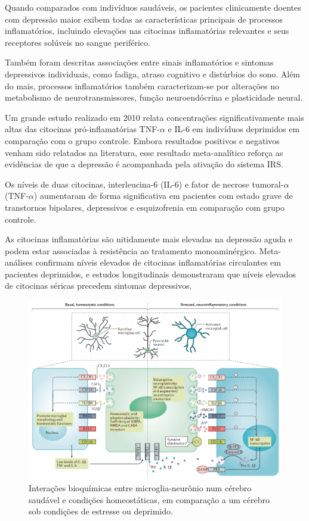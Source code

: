 Quando comparados com indivíduos saudáveis, os pacientes clinicamente doentes com depressão maior exibem todas as características principais de processos inflamatórios, incluindo elevações nas citocinas inflamatórias relevantes e seus receptores solúveis no sangue periférico. \cite{Raison2009}

Também foram descritas associações entre sinais inflamatórios e sintomas depressivos individuais, como fadiga, atraso cognitivo e distúrbios do sono. Além do mais, processos inflamatórios também caracterizam-se por alterações no metabolismo de neurotransmissores, função neuroendócrina e plasticidade neural.\cite{Raison2009} 

Um grande estudo realizado em 2010 relata concentrações significativamente mais altas das citocinas pró-inflamatórias TNF-$\alpha$ e IL-6 em indivíduos deprimidos em comparação com o grupo controle. Embora resultados positivos e negativos venham sido relatados na literatura, esse resultado meta-analítico reforça as evidências de que a depressão é acompanhada pela ativação do sistema IRS. \cite{Dawlati2010}

Os níveis de duas citocinas, interleucina-6 (IL-6) e fator de necrose tumoral-$\alpha$ (TNF-$\alpha$) aumentaram de forma significativa em pacientes com estado grave de transtornos bipolares, depressivos e esquizofrenia em comparação com grupo controle. \cite{Miller2016}

As citocinas inflamatórias são nitidamente mais elevadas na depressão aguda e podem estar associadas à resistência ao tratamento monoaminérgico. Meta-análises confirmam níveis elevados de citocinas inflamatórias circulantes em pacientes deprimidos, e estudos longitudinais demonstraram que níveis elevados de citocinas séricas precedem sintomas depressivos. \cite{Kappelmann2018}

\begin{figure}[H]
\centering
\includegraphics[scale=1]{Figuras/immunitary_system.png}
\caption{Interações bioquímicas entre microglia-neurônio num cérebro saudável e condições homeostáticas, em comparação a um cérebro sob condições de estresse ou deprimido. \cite{Iwata2016}}
\end{figure}

